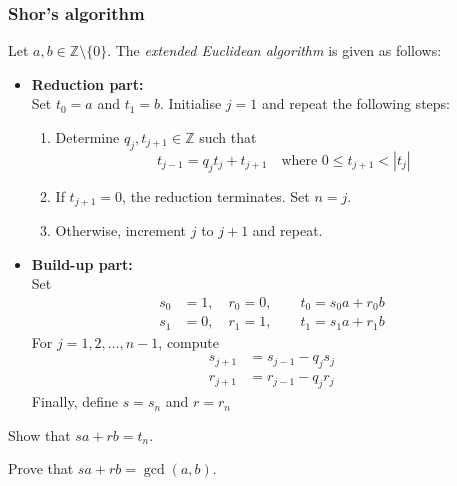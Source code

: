 \documentclass[a4paper, oneside, 12pt]{amsart}
\begin{document}
\subsubsection{Shor's algorithm}
\begin{exercise}\label{exe:extended-Euclidean-algo}
  Let \(a, b \in \mathbb{Z} \setminus \{0\}\).
  The \emph{extended Euclidean algorithm} is given as follows:

  \begin{itemize}
    \item \textbf{Reduction part:} \\
    Set \(t_{0} = a\) and \(t_{1} = b\).
    Initialise \(j = 1\) and repeat the following steps:
    \begin{enumerate}
      \item Determine \(q_{j}, t_{j+1} \in \mathbb{Z}\) such that
      \begin{equation*}
        t_{j-1} = q_{j}t_{j} + t_{j+1} \quad \text{where } 0 \leq t_{j+1} < |t_{j}|
      \end{equation*}
      \item If \(t_{j+1} = 0\), the reduction terminates.
      Set \(n = j\).
      \item Otherwise, increment \(j\) to \(j+1\) and repeat.
    \end{enumerate}

    \item \textbf{Build-up part:} \\
    Set
    \begin{align*}
      s_0 &= 1, \quad r_0 = 0, \qquad t_0 = s_0 a + r_0 b \\
      s_1 &= 0, \quad r_1 = 1, \qquad t_1 = s_1 a + r_1 b
    \end{align*}
    For \(j = 1, 2, \dots, n-1\), compute
    \begin{align*}
      s_{j+1} &= s_{j-1} - q_{j}s_{j} \\
      r_{j+1} &= r_{j-1} - q_{j}r_{j}
    \end{align*}
    Finally, define \(s=s_{n}\) and \(r=r_{n}\)
  \end{itemize}

  \begin{thmlist}
    \item Show that \(sa + rb = t_{n}\).
    \item Prove that \(sa + rb = \gcd(a,b)\).
  \end{thmlist}
\end{exercise}
\end{document}
